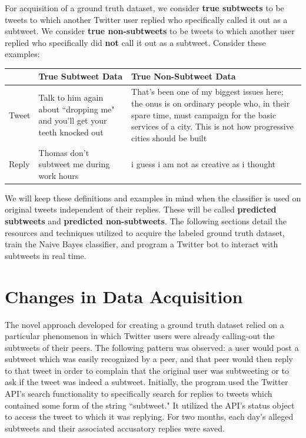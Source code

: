 \documentclass[11pt, twoside, reqno]{book}
\begin{document}
For acquisition of a ground truth dataset, we consider \textbf{true subtweets} to be tweets to which another Twitter user replied who specifically called it out as a subtweet. We consider \textbf{true non-subtweets} to be tweets to which another user replied who specifically did \textbf{not} call it out as a subtweet. Consider these examples:

\begin{center}
	\begin{tabular}{ | p{5em} | p{17.5em} | p{17.5em} | }
		\hline
		& True Subtweet Data& True Non-Subtweet Data
		\\ 
		\hline
		Tweet&Talk to him again about ``dropping me" and you'll get your teeth knocked out&That's been one of my biggest issues here; the onus is on ordinary people who, in their spare time, must campaign for the basic services of a city. This is not how progressive cities should be built 
		\\ 
		\hline
		Reply&Thomas don't subtweet me during work hours&i guess i am not as creative as i thought
		\\
		\hline
	\end{tabular}
\end{center}

We will keep these definitions and examples in mind when the classifier is used on original tweets independent of their replies. These will be called \textbf{predicted subtweets} and \textbf{predicted non-subtweets}. The following sections detail the resources and techniques utilized to acquire the labeled ground truth dataset, train the Naive Bayes classifier, and program a Twitter bot to interact with subtweets in real time.

\section{Changes in Data Acquisition}
\label{changes_in_data}

The novel approach developed for creating a ground truth dataset relied on a particular phenomenon in which Twitter users were already calling-out the subtweets of their peers. The following pattern was observed: a user would post a subtweet which was easily recognized by a peer, and that peer would then reply to that tweet in order to complain that the original user was subtweeting or to ask if the tweet was indeed a subtweet. Initially, the program used the Twitter API's search functionality to specifically search for replies to tweets which contained some form of the string ``subtweet." It utilized the API's status object to access the tweet to which it was replying. For two months, each day's alleged subtweets and their associated accusatory replies were saved.
\end{document}
